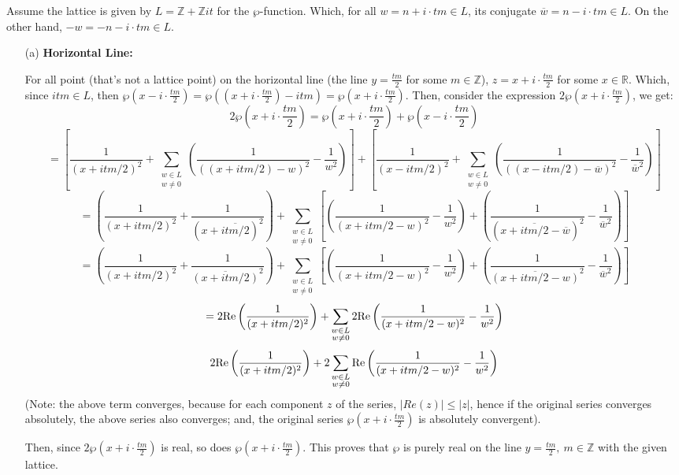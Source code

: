 \documentclass{article}
\begin{document}
Assume the lattice is given by $L=\mathbb{Z}+\mathbb{Z}it$ for the $\wp$-function. Which, for all $w=n+i\cdot tm\in L$, its conjugate $\overline{w}=n-i\cdot tm\in L$. On the other hand, $-w = -n-i\cdot tm\in L$.
\begin{itemize}
    \item[(a)] \textbf{Horizontal Line:}
    
    For all point (that's not a lattice point) on the horizontal line (the line $y=\frac{tm}{2}$ for some $m\in\mathbb{Z}$), $z=x+i\cdot\frac{tm}{2}$ for some $x\in\mathbb{R}$. 
    Which, since $itm\in L$, then $\wp(x-i\cdot\frac{tm}{2})=\wp((x+i\cdot\frac{tm}{2})-itm) = \wp(x+i\cdot\frac{tm}{2})$. Then, consider the expression $2\wp(x+i\cdot\frac{tm}{2})$, we get:
    $$2\wp\left(x+i\cdot\frac{tm}{2}\right) = \wp\left(x+i\cdot\frac{tm}{2}\right)+\wp\left(x-i\cdot\frac{tm}{2}\right)$$
    $$=\left[\frac{1}{(x+itm/2)^2}+\sum_{\substack{w\in L\\w\neq 0}}\left(\frac{1}{((x+itm/2)-w)^2}-\frac{1}{w^2}\right)\right]+\left[\frac{1}{(x-itm/2)^2}+\sum_{\substack{w\in L\\w\neq 0}}\left(\frac{1}{((x-itm/2)-\overline{w})^2}-\frac{1}{\overline{w}^2}\right)\right]$$
    $$=\left(\frac{1}{(x+itm/2)^2}+\frac{1}{(x+\overline{itm/2})^2}\right)+\sum_{\substack{w\in L\\w\neq 0}}\left[\left(\frac{1}{(x+itm/2-w)^2}-\frac{1}{w^2}\right)+\left(\frac{1}{(x+\overline{itm/2}-\overline{w})^2}-\frac{1}{\overline{w}^2}\right)\right]$$
    $$=\left(\frac{1}{(x+itm/2)^2}+\frac{1}{\overline{(x+itm/2)}^2}\right)+\sum_{\substack{w\in L\\w\neq 0}}\left[\left(\frac{1}{(x+itm/2-w)^2}-\frac{1}{w^2}\right)+\left(\frac{1}{\overline{(x+itm/2-w)}^2}-\frac{1}{\overline{w}^2}\right)\right]$$
    $$= 2\textmd{Re}\left(\frac{1}{(x+itm/2)^2}\right)+\sum_{\substack{w\in L\\w\neq 0}}2\textmd{Re}\left(\frac{1}{(x+itm/2-w)^2}-\frac{1}{w^2}\right)$$
    $$2\textmd{Re}\left(\frac{1}{(x+itm/2)^2}\right)+2\sum_{\substack{w\in L\\w\neq 0}}\textmd{Re}\left(\frac{1}{(x+itm/2-w)^2}-\frac{1}{w^2}\right)$$
    (Note: the above term converges, because for each component $z$ of the series, $|Re(z)|\leq |z|$, hence if the original series converges absolutely, the above series also converges; and, the original series $\wp(x+i\cdot\frac{tm}{2})$ is absolutely convergent).
    
    Then, since $2\wp(x+i\cdot\frac{tm}{2})$ is real, so does $\wp(x+i\cdot\frac{tm}{2})$. This proves that $\wp$ is purely real on the line $y=\frac{tm}{2},\ m\in\mathbb{Z}$ with the given lattice.


\end{itemize}
\end{document}
